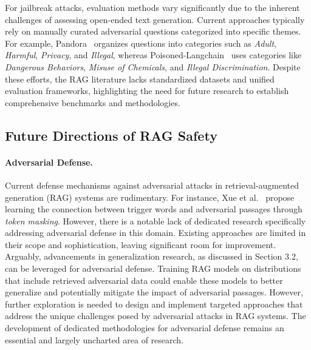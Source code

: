 For jailbreak attacks, evaluation methods vary significantly due to the inherent challenges of assessing open-ended text generation. Current approaches typically rely on manually curated adversarial questions categorized into specific themes. For example, Pandora~\cite{deng2024pandorajailbreakgptsretrieval} organizes questions into categories such as \textit{Adult}, \textit{Harmful}, \textit{Privacy}, and \textit{Illegal}, whereas Poisoned-Langchain~\cite{wang2024poisonedlangchainjailbreakllms} uses categories like \textit{Dangerous Behaviors}, \textit{Misuse of Chemicals}, and \textit{Illegal Discrimination}. Despite these efforts, the RAG literature lacks standardized datasets and unified evaluation frameworks, highlighting the need for future research to establish comprehensive benchmarks and methodologies.

\subsection{Future Directions of RAG Safety}
\label{subsec:robust_future}
\paragraph{Adversarial Defense.}
Current defense mechanisms against adversarial attacks in retrieval-augmented generation (RAG) systems are rudimentary. For instance, Xue et al.~\cite{xue2024badrag} propose learning the connection between trigger words and adversarial passages through \textit{token masking}. However, there is a notable lack of dedicated research specifically addressing adversarial defense in this domain. Existing approaches are limited in their scope and sophistication, leaving significant room for improvement. Arguably, advancements in generalization research, as discussed in Section 3.2, can be leveraged for adversarial defense. Training RAG models on distributions that include retrieved adversarial data could enable these models to better generalize and potentially mitigate the impact of adversarial passages. However, further exploration is needed to design and implement targeted approaches that address the unique challenges posed by adversarial attacks in RAG systems. The development of dedicated methodologies for adversarial defense remains an essential and largely uncharted area of research.

